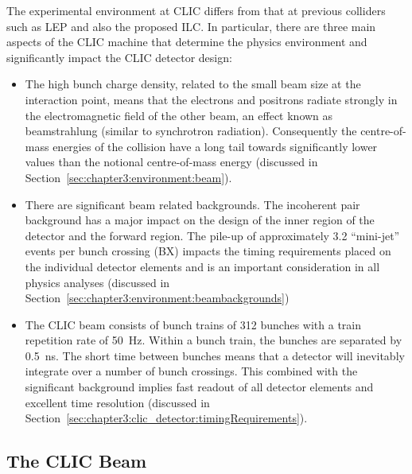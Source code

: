 The experimental environment at CLIC differs from that at previous \epem
colliders such as \acs{LEP} and also the proposed \acs{ILC}. In particular, there are three
main aspects of the CLIC machine that determine the physics environment and
significantly impact the CLIC detector design:
\begin{itemize}
\item The high bunch charge density, related to the small beam size at the
interaction point, means that the electrons and positrons radiate strongly
in the electromagnetic field of the other beam, an effect known as
beamstrahlung (similar to synchrotron radiation). Consequently the 
centre-of-mass energies of the \epem collision have a long tail towards
significantly lower values than the notional centre-of-mass energy (discussed
in Section~\ref{sec:chapter3:environment:beam}). 
\item There are significant beam related backgrounds. The \epem incoherent
pair background has a major impact on the design of the inner region of the
detector and the forward region. The pile-up of approximately 3.2
\gghadrons ``mini-jet'' events per bunch crossing (BX) impacts the timing
requirements placed on the individual detector elements and is an important
consideration in all physics analyses (discussed in
Section~\ref{sec:chapter3:environment:beambackgrounds})
\item The CLIC beam consists of bunch trains of 312 bunches with a train
repetition rate of 50~Hz. Within a bunch train, the bunches are separated
by 0.5~ns. The short time between bunches means that a detector will
inevitably integrate over a number of bunch crossings. This combined with
the significant \gghadrons background implies fast readout of all detector
elements and excellent time resolution (discussed in
Section~\ref{sec:chapter3:clic_detector:timingRequirements}). 
\end{itemize} 

\subsection{The CLIC Beam \label{sec:chapter3:environment:beam}}

